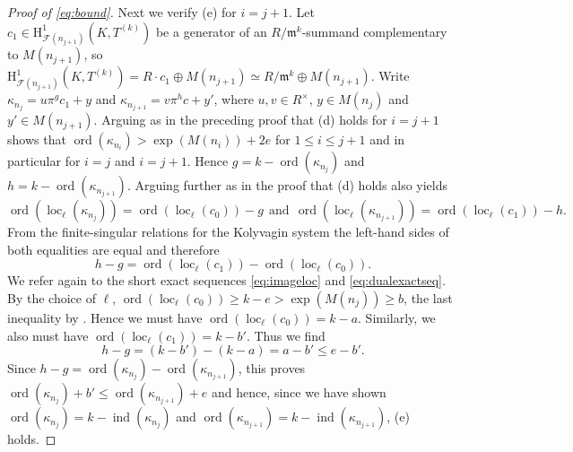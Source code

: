 \documentclass[a4paper,10pt]{amsart}
\numberwithin{equation}{section}
\numberwithin{equation}{section}
\theoremstyle{plain}
\theoremstyle{definition}
\newtheorem{rmk}[thm]{Remark}
\theoremstyle{definition}
\theoremstyle{plain}
\theoremstyle{plain}
\theoremstyle{plain}
\theoremstyle{plain}
\DeclareMathOperator{\ord}{ord}
\newcommand{\ind}{\operatorname{ind}}
\DeclareMathOperator{\loc}{loc}
\newcommand{\CF}{\mathcal{F}}
\newcommand{\Fcal}{\mathcal{F}}
\newcommand{\kap}{\kappa}
\newcommand{\fm}{\mathfrak{m}}
\newcommand{\rH}{\mathrm{H}}
\begin{document}
\begin{proof}[Proof of \eqref{eq:bound}]
Next we verify (e) for $i={j+1}$. Let $c_1\in \rH^1_{\CF(n_{j+1})}(K,T^{(k)})$ be a generator of an $R/\fm^k$-summand
complementary to $M(n_{j+1})$, so $\rH^1_{\CF(n_{j+1})}(K,T^{(k)}) = R\cdot c_1\oplus M(n_{j+1})\simeq R/\fm^k\oplus M(n_{j+1})$. 
Write $\kap_{n_j} = u\pi^g c_1 + y$ and $\kap_{n_{j+1}} = v\pi^h c + y'$, where $u,v\in R^\times$, $y\in M(n_{j})$ and $y'\in M(n_{j+1})$. 
Arguing as in the preceding proof that (d) holds for $i={j+1}$ shows that 
$\ord(\kap_{n_i})> \exp(M(n_i))+2e$ for $1\leqslant i\leqslant j+1$ and in particular for $i=j$ and $i=j+1$. 
Hence  $g = k - \ord(\kap_{n_j})$ and $h = k - \ord(\kap_{n_{j+1}})$.
Arguing further as in the proof that (d) holds also yields
$$
\ord(\loc_\ell(\kap_{n_j}))  = \ord(\loc_\ell(c_0))-g \ \ \text{and} \ \  \ord(\loc_\ell(\kap_{n_{j+1}})) = \ord(\loc_\ell(c_1))-h.
$$
From the finite-singular relations for the Kolyvagin system the left-hand sides of both equalities are equal and therefore
$$
h-g = \ord(\loc_\ell(c_1))-\ord(\loc_\ell(c_0)).
$$
We refer again to the short exact sequences \eqref{eq:imageloc} and \eqref{eq:dualexactseq}.
By the choice of $\ell$, 
$\ord(\loc_\ell(c_0))\geq k-e> \exp(M(n_j))\geq b$, the last inequality by \cite[Lem.~3.3.10(ii)]{eisenstein}. Hence we must have 
$\ord(\loc_\ell(c_0))=k-a$. Similarly,  we also must have $\ord(\loc_\ell(c_1))=k-b'$. Thus we find
$$
h-g =  (k-b')-(k-a) = a-b' \leq e -b'.
$$
Since $h-g = \ord(\kap_{n_j})-\ord(\kap_{n_{j+1}})$, this proves $\ord(\kap_{n_j})+b'\leq \ord(\kap_{n_{j+1}})+e$ and hence, since we have shown $\ord(\kap_{n_j})=k-\ind(\kap_{n_j})$ and $\ord(\kap_{n_{j+1}})=k-\ind(\kap_{n_{j+1}})$, (e) holds.



\end{proof}
\end{document}

